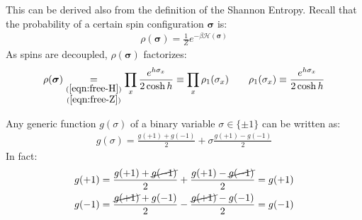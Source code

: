\documentclass[../../main.tex]{subfiles}
\begin{document}
\begin{example}
    This can be derived also from the definition of the Shannon Entropy. Recall that the probability of a certain spin configuration $\bm{\sigma}$ is:
    \begin{align*}
        \rho(\bm{\sigma}) = \frac{1}{Z} e^{- \beta \mathcal{H}(\bm{\sigma})} 
    \end{align*}
    As spins are decoupled, $\rho(\bm{\sigma})$ factorizes: 
    \begin{align}\label{eqn:rho1}
        \rho(\bm{\sigma}) \underset{\substack{(\ref{eqn:free-H})\\(\ref{eqn:free-Z})}}{=}  \prod_x \frac{e^{h \sigma_x}}{2 \cosh h}  \equiv \prod_x \rho_1(\sigma_x) \qquad \rho_1(\sigma_x) \equiv \frac{e^{h \sigma_x}}{2 \cosh h} 
    \end{align}

    Any generic function $g(\sigma)$ of a binary variable $\sigma \in \{\pm 1\}$ can be written as:
    \begin{align*}
        g(\sigma) = \frac{g(+1) + g(-1)}{2} + \sigma \frac{g(+1) - g(-1)}{2}  
    \end{align*}
    In fact:
    \begin{align*}
        g(+1) &= \frac{g(+1) + \cancel{g(-1)}}{2} +\frac{g(+1) - \cancel{g(-1)}}{2} = g(+1)\\
        g(-1) &= \frac{\cancel{g(+1)} + g(-1)}{2} - \frac{\cancel{g(+1)} - g(-1)}{2} = g(-1)
    \end{align*}


\end{example}
\end{document}
